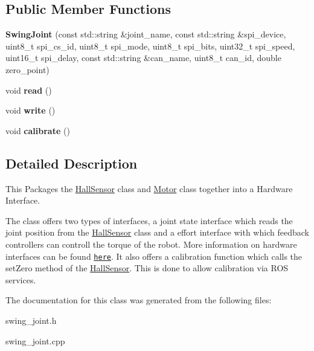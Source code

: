 \subsection*{Public Member Functions}
\begin{DoxyCompactItemize}
\item 
{\bfseries Swing\+Joint} (const std\+::string \&joint\+\_\+name, const std\+::string \&spi\+\_\+device, uint8\+\_\+t spi\+\_\+cs\+\_\+id, uint8\+\_\+t spi\+\_\+mode, uint8\+\_\+t spi\+\_\+bits, uint32\+\_\+t spi\+\_\+speed, uint16\+\_\+t spi\+\_\+delay, const std\+::string \&can\+\_\+name, uint8\+\_\+t can\+\_\+id, double zero\+\_\+point)\hypertarget{classSwingJoint_a9ddb518c4aff708a5b96290001af7a11}{}\label{classSwingJoint_a9ddb518c4aff708a5b96290001af7a11}

\item 
void {\bfseries read} ()\hypertarget{classSwingJoint_a3f966fc71b37d8e5c34e2ddc5ec79e03}{}\label{classSwingJoint_a3f966fc71b37d8e5c34e2ddc5ec79e03}

\item 
void {\bfseries write} ()\hypertarget{classSwingJoint_aa2d54c4712616e04e36af2db528384ab}{}\label{classSwingJoint_aa2d54c4712616e04e36af2db528384ab}

\item 
void {\bfseries calibrate} ()\hypertarget{classSwingJoint_acbdd7fae2441b423d146240322c1f848}{}\label{classSwingJoint_acbdd7fae2441b423d146240322c1f848}

\end{DoxyCompactItemize}


\subsection{Detailed Description}
This Packages the \hyperlink{classHallSensor}{Hall\+Sensor} class and \hyperlink{classMotor}{Motor} class together into a Hardware Interface. 

The class offers two types of interfaces, a joint state interface which reads the joint position from the \hyperlink{classHallSensor}{Hall\+Sensor} class and a effort interface with which feedback controllers can controll the torque of the robot. More information on hardware interfaces can be found \href{http://wiki.ros.org/ros_control#Hardware_Interfaces}{\tt here}. It also offers a calibration function which calls the set\+Zero method of the \hyperlink{classHallSensor}{Hall\+Sensor}. This is done to allow calibration via R\+OS services. 

The documentation for this class was generated from the following files\+:\begin{DoxyCompactItemize}
\item 
swing\+\_\+joint.\+h\item 
swing\+\_\+joint.\+cpp\end{DoxyCompactItemize}
